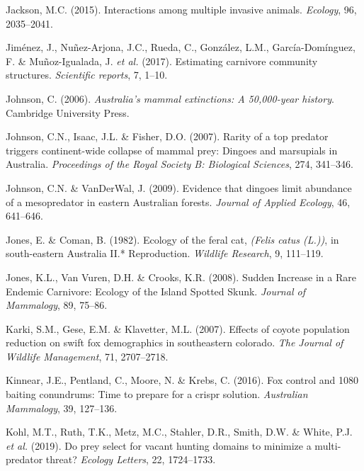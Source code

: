 \documentclass[11pt,a4paper,titlepage,twoside,openright]{style/unimelbthesis}
\begin{document}
\begin{mainmatter}
\leavevmode\hypertarget{ref-jackson2015interactions}{}%
Jackson, M.C. (2015). Interactions among multiple invasive animals. \emph{Ecology}, 96, 2035--2041.

\leavevmode\hypertarget{ref-jimenez2017estimating}{}%
Jiménez, J., Nuñez-Arjona, J.C., Rueda, C., González, L.M., García-Domínguez, F. \& Muñoz-Igualada, J. \emph{et al.} (2017). Estimating carnivore community structures. \emph{Scientific reports}, 7, 1--10.

\leavevmode\hypertarget{ref-johnson2006australia}{}%
Johnson, C. (2006). \emph{Australia's mammal extinctions: A 50,000-year history}. Cambridge University Press.

\leavevmode\hypertarget{ref-johnson2007rarity}{}%
Johnson, C.N., Isaac, J.L. \& Fisher, D.O. (2007). Rarity of a top predator triggers continent-wide collapse of mammal prey: Dingoes and marsupials in Australia. \emph{Proceedings of the Royal Society B: Biological Sciences}, 274, 341--346.

\leavevmode\hypertarget{ref-johnson2009evidence}{}%
Johnson, C.N. \& VanDerWal, J. (2009). Evidence that dingoes limit abundance of a mesopredator in eastern Australian forests. \emph{Journal of Applied Ecology}, 46, 641--646.

\leavevmode\hypertarget{ref-jones1982ecology}{}%
Jones, E. \& Coman, B. (1982). Ecology of the feral cat, \emph{(Felis catus (L.))}, in south-eastern Australia II.* Reproduction. \emph{Wildlife Research}, 9, 111--119.

\leavevmode\hypertarget{ref-jones2008sudden}{}%
Jones, K.L., Van Vuren, D.H. \& Crooks, K.R. (2008). Sudden Increase in a Rare Endemic Carnivore: Ecology of the Island Spotted Skunk. \emph{Journal of Mammalogy}, 89, 75--86.

\leavevmode\hypertarget{ref-karki2007effects}{}%
Karki, S.M., Gese, E.M. \& Klavetter, M.L. (2007). Effects of coyote population reduction on swift fox demographics in southeastern colorado. \emph{The Journal of Wildlife Management}, 71, 2707--2718.

\leavevmode\hypertarget{ref-kinnear2016fox}{}%
Kinnear, J.E., Pentland, C., Moore, N. \& Krebs, C. (2016). Fox control and 1080 baiting conundrums: Time to prepare for a crispr solution. \emph{Australian Mammalogy}, 39, 127--136.

\leavevmode\hypertarget{ref-kohl2019prey}{}%
Kohl, M.T., Ruth, T.K., Metz, M.C., Stahler, D.R., Smith, D.W. \& White, P.J. \emph{et al.} (2019). Do prey select for vacant hunting domains to minimize a multi-predator threat? \emph{Ecology Letters}, 22, 1724--1733.


\end{mainmatter}
\end{document}
